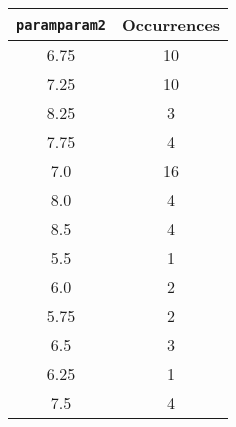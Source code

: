 \documentclass[letterpaper, 12pt]{article}
\begin{document}
\begin{longtable}{|c|c|}
\hline
\textbf{\texttt{paramparam2}} & \textbf{Occurrences} \\
\hline
6.75 & 10 \\
\hline
7.25 & 10 \\
\hline
8.25 & 3 \\
\hline
7.75 & 4 \\
\hline
7.0 & 16 \\
\hline
8.0 & 4 \\
\hline
8.5 & 4 \\
\hline
5.5 & 1 \\
\hline
6.0 & 2 \\
\hline
5.75 & 2 \\
\hline
6.5 & 3 \\
\hline
6.25 & 1 \\
\hline
7.5 & 4 \\
\hline
\end{longtable}
\end{document}
